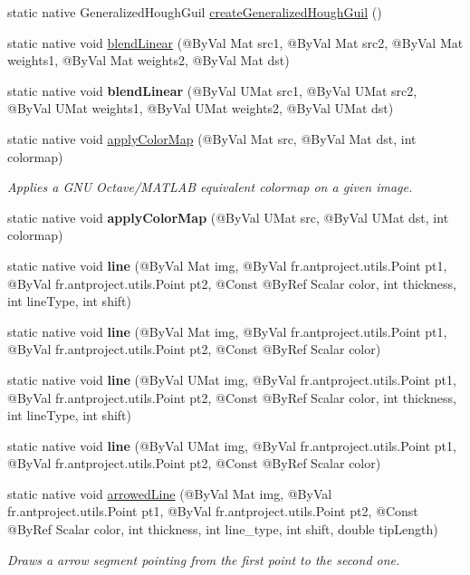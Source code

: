 \begin{DoxyCompactItemize}
\item 
static native Generalized\+Hough\+Guil \hyperlink{group__imgproc__filter_ga5b2d07c2bc26dfd8aa2daeae1b3adfac}{create\+Generalized\+Hough\+Guil} ()
\item 
static native void \hyperlink{group__imgproc__filter_gadbbb8985760a3feef02011466803a5a2}{blend\+Linear} (@By\+Val Mat src1, @By\+Val Mat src2, @By\+Val Mat weights1, @By\+Val Mat weights2, @By\+Val Mat dst)
\item 
static native void {\bfseries blend\+Linear} (@By\+Val U\+Mat src1, @By\+Val U\+Mat src2, @By\+Val U\+Mat weights1, @By\+Val U\+Mat weights2, @By\+Val U\+Mat dst)
\item 
static native void \hyperlink{group__imgproc__colormap_ga06d689b1055417421851333387c2b607}{apply\+Color\+Map} (@By\+Val Mat src, @By\+Val Mat dst, int colormap)
\begin{DoxyCompactList}\small\item\em Applies a G\+NU Octave/\+M\+A\+T\+L\+AB equivalent colormap on a given image. \end{DoxyCompactList}\item 
static native void {\bfseries apply\+Color\+Map} (@By\+Val U\+Mat src, @By\+Val U\+Mat dst, int colormap)
\item 
static native void {\bfseries line} (@By\+Val Mat img, @By\+Val fr.antproject.utils.Point pt1, @By\+Val fr.antproject.utils.Point pt2, @Const @By\+Ref Scalar color, int thickness, int line\+Type, int shift)
\item 
static native void {\bfseries line} (@By\+Val Mat img, @By\+Val fr.antproject.utils.Point pt1, @By\+Val fr.antproject.utils.Point pt2, @Const @By\+Ref Scalar color)
\item 
static native void {\bfseries line} (@By\+Val U\+Mat img, @By\+Val fr.antproject.utils.Point pt1, @By\+Val fr.antproject.utils.Point pt2, @Const @By\+Ref Scalar color, int thickness, int line\+Type, int shift)
\item 
static native void {\bfseries line} (@By\+Val U\+Mat img, @By\+Val fr.antproject.utils.Point pt1, @By\+Val fr.antproject.utils.Point pt2, @Const @By\+Ref Scalar color)
\item 
static native void \hyperlink{group__imgproc__draw_gae4f0557739b8a995e8297d30b3d8a00c}{arrowed\+Line} (@By\+Val Mat img, @By\+Val fr.antproject.utils.Point pt1, @By\+Val fr.antproject.utils.Point pt2, @Const @By\+Ref Scalar color, int thickness, int line\+\_\+type, int shift, double tip\+Length)
\begin{DoxyCompactList}\small\item\em Draws a arrow segment pointing from the first point to the second one. \end{DoxyCompactList}\item 

\end{DoxyCompactItemize}
